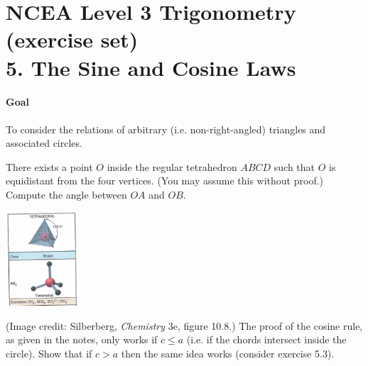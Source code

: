 \documentclass[answers]{exam}
\begin{document}
\section*{NCEA Level 3 Trigonometry (exercise set)\\5. The Sine and Cosine Laws}
\paragraph{Goal} To consider the relations of arbitrary (i.e. non-right-angled) triangles and associated circles.

\begin{questions}
  \question There exists a point $ O $ inside the regular tetrahedron $ ABCD $ such that $ O $ is equidistant from
            the four vertices. (You may assume this without proof.) Compute the angle between $ OA $ and $ OB $.
            \begin{center}
              \includegraphics[width=0.2\textwidth]{exercises-5-3}
            \end{center}
            (Image credit: Silberberg, \textit{Chemistry} 3e, figure 10.8.)
  \question The proof of the cosine rule, as given in the notes, only works if $ c \leq a $ (i.e. if the chords intersect
            inside the circle). Show that if $ c > a $ then the same idea works (consider exercise 5.3).
  \question
\end{questions}
\end{document}
